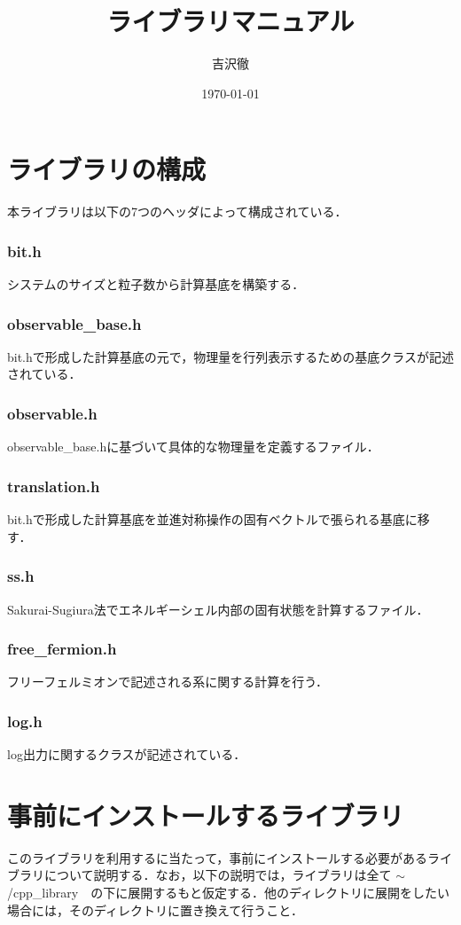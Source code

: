 \documentclass[report, 11pt, uplatex]{jsbook}
\title{ライブラリマニュアル}
\author{吉沢徹}
\date{\today}
\begin{document}
	\maketitle
	\tableofcontents
	\chapter{ライブラリの構成}
	本ライブラリは以下の7つのヘッダによって構成されている．
	\subsection*{bit.h}
	システムのサイズと粒子数から計算基底を構築する．
	
	\subsection*{observable\_base.h}
	bit.hで形成した計算基底の元で，物理量を行列表示するための基底クラスが記述されている．
	
	\subsection*{observable.h}
	observable\_base.hに基づいて具体的な物理量を定義するファイル．
	
	\subsection*{translation.h}
	bit.hで形成した計算基底を並進対称操作の固有ベクトルで張られる基底に移す．
	
	\subsection*{ss.h}
	Sakurai-Sugiura法でエネルギーシェル内部の固有状態を計算するファイル．
	
	\subsection*{free\_fermion.h}
	フリーフェルミオンで記述される系に関する計算を行う．
	
	\subsection*{log.h}
	log出力に関するクラスが記述されている．
	
	\chapter{事前にインストールするライブラリ}
	このライブラリを利用するに当たって，事前にインストールする必要があるライブラリについて説明する．なお，以下の説明では，ライブラリは全て $\sim$/cpp\_library　の下に展開するもと仮定する．他のディレクトリに展開をしたい場合には，そのディレクトリに置き換えて行うこと．
	
\end{document}

